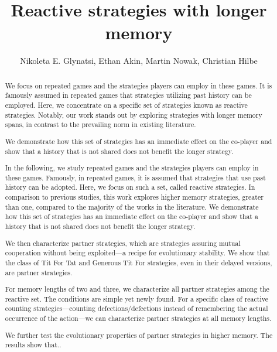 \documentclass{article}
\title{Reactive strategies with longer memory}
\author{Nikoleta E. Glynatsi, Ethan Akin, Martin Nowak, Christian Hilbe}
\date{}
\theoremstyle{definition}
\begin{document}
\maketitle

\begin{abstract}

We focus on repeated games and the strategies players can employ in these
games. It is famously assumed in repeated games that strategies utilizing past
history can be employed. Here, we concentrate on a specific set of strategies
known as reactive strategies. Notably, our work stands out by exploring
strategies with longer memory spans, in contrast to the prevailing norm in
existing literature.

We demonstrate how this set of strategies has an immediate effect on the
co-player and show that a history that is not shared does not benefit the longer
strategy.

In the following, we study repeated games and the strategies players can employ
in these games. Famously, in repeated games, it is assumed that strategies that
use past history can be adopted. Here, we focus on such a set, called reactive
strategies. In comparison to previous studies, this work explores higher memory
strategies, greater than one, compared to the majority of the works in the
literature. We demonstrate how this set of strategies has an immediate effect on
the co-player and show that a history that is not shared does not benefit the
longer strategy.

We then characterize partner strategies, which are strategies assuring mutual
cooperation without being exploited—a recipe for evolutionary stability. We show
that the class of Tit For Tat and Generous Tit For strategies, even in their
delayed versions, are partner strategies.

For memory lengths of two and three, we characterize all partner strategies
among the reactive set. The conditions are simple yet newly found. For a
specific class of reactive counting strategies—counting defections/defections
instead of remembering the actual occurrence of the action—we can characterize
partner strategies at all memory lengths.

We further test the evolutionary properties of partner strategies in higher
memory. The results show that..



\end{abstract}
\end{document}
